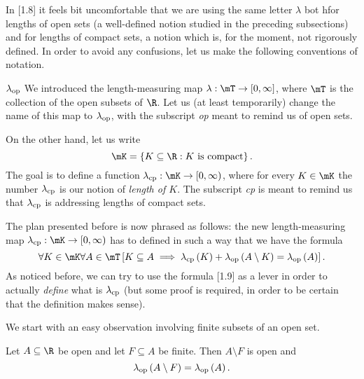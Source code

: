 \documentclass[pmath450]{subfiles}
\begin{document}
    \np In [1.8] it feels bit uncomfortable that we are using the same letter $\lambda$ bot hfor lengths of open sets (a well-defined notion studied in the preceding subsections) and for lengths of compact sets, a notion which is, for the moment, not rigorously defined. In order to avoid any confusions, let us make the following conventions of notation.

    \begin{notation}{$\lambda_{\operatorname{op}}$}
        We introduced the length-measuring map $\lambda:\mT\to\left[ 0,\infty \right]$, where $\mT$ is the collection of the open subsets of $\R$. Let us (at least temporarily) change the name of this map to $\lambda_{\operatorname{op}}$, with the subscript \textit{op} meant to remind us of open sets.
    \end{notation}

    \np On the other hand, let us write
    \begin{equation*}
        \mK = \left\lbrace K\subseteq\R:K\text{ is compact} \right\rbrace.
    \end{equation*}
    The goal is to define a function $\lambda_{\cp}:\mK\to\left[ 0,\infty \right)$, where for every $K\in\mK$ the number $\lambda_{\operatorname{cp}}$ is our notion of \textit{length of $K$}. The subscript \textit{cp} is meant to remind us that $\lambda_{\operatorname{cp}}$ is addressing lengths of compact sets.

    The plan presented before is now phrased as follows: the new length-measuring map $\lambda_{\cp}:\mK\to\left[ 0,\infty \right)$ has to defined in such a way that we have the formula
    \begin{equation}
        \forall K\in\mK\forall A\in\mT \left[ K\subseteq A\implies \lambda_{\cp}\left( K \right)+\lambda_{\op}\left( A\setminus K \right) = \lambda_{\op}\left( A \right)\right].
    \end{equation}
    As noticed before, we can try to use the formula [1.9] as a lever in order to actually \textit{define} what is $\lambda_{\operatorname{cp}}$ (but some proof is required, in order to be certain that the definition makes sense).

    \np We start with an easy observation involving finite subsets of an open set.

    \begin{lemma}{}
        Let $A\subseteq\R$ be open and let $F\subseteq A$ be finite. Then $A\setminus F$ is open and
        \begin{equation*}
            \lambda_{\operatorname{op}}\left( A\setminus F \right)=\lambda_{\operatorname{op}}\left( A \right).
        \end{equation*}
    \end{lemma}
\end{document}
